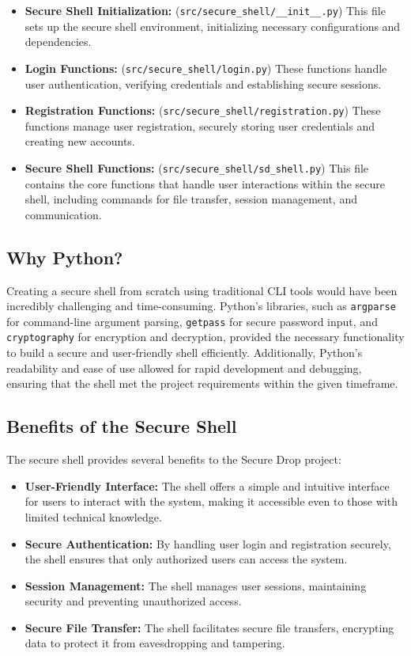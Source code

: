 \documentclass[12pt]{article}
\begin{document}
\begin{itemize}
    \item \textbf{Secure Shell Initialization:} (\texttt{src/secure\_shell/\_\_init\_\_.py}) This file sets up the secure shell environment, initializing necessary configurations and dependencies.
    \item \textbf{Login Functions:} (\texttt{src/secure\_shell/login.py}) These functions handle user authentication, verifying credentials and establishing secure sessions.
    \item \textbf{Registration Functions:} (\texttt{src/secure\_shell/registration.py}) These functions manage user registration, securely storing user credentials and creating new accounts.
    \item \textbf{Secure Shell Functions:} (\texttt{src/secure\_shell/sd\_shell.py}) This file contains the core functions that handle user interactions within the secure shell, including commands for file transfer, session management, and communication.
\end{itemize}

\subsection{Why Python?}
Creating a secure shell from scratch using traditional CLI tools would have been incredibly challenging and time-consuming. Python's libraries, such as \texttt{argparse} for command-line argument parsing, \texttt{getpass} for secure password input, and \texttt{cryptography} for encryption and decryption, provided the necessary functionality to build a secure and user-friendly shell efficiently. Additionally, Python's readability and ease of use allowed for rapid development and debugging, ensuring that the shell met the project requirements within the given timeframe.

\subsection{Benefits of the Secure Shell}
The secure shell provides several benefits to the Secure Drop project:
\begin{itemize}
    \item \textbf{User-Friendly Interface:} The shell offers a simple and intuitive interface for users to interact with the system, making it accessible even to those with limited technical knowledge.
    \item \textbf{Secure Authentication:} By handling user login and registration securely, the shell ensures that only authorized users can access the system.
    \item \textbf{Session Management:} The shell manages user sessions, maintaining security and preventing unauthorized access.
    \item \textbf{Secure File Transfer:} The shell facilitates secure file transfers, encrypting data to protect it from eavesdropping and tampering.
\end{itemize}
\end{document}
